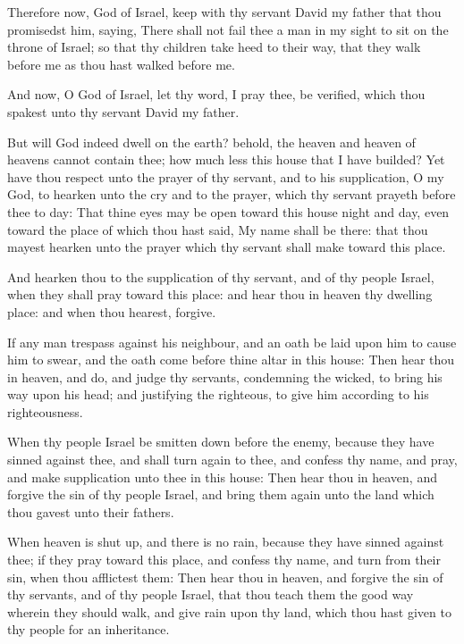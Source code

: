 \Verse Therefore now, \LORD God of Israel, keep with thy servant David my father that thou promisedst him, saying, There shall not fail thee a man in my sight to sit on the throne of Israel; so that thy children take heed to their way, that they walk before me as thou hast walked before me.

\Verse And now, O God of Israel, let thy word, I pray thee, be verified, which thou spakest unto thy servant David my father.

\Verse But will God indeed dwell on the earth? behold, the heaven and heaven of heavens cannot contain thee; how much less this house that I have builded?  \Verse Yet have thou respect unto the prayer of thy servant, and to his supplication, O \LORD my God, to hearken unto the cry and to the prayer, which thy servant prayeth before thee to day: \Verse That thine eyes may be open toward this house night and day, even toward the place of which thou hast said, My name shall be there: that thou mayest hearken unto the prayer which thy servant shall make toward this place.

\Verse And hearken thou to the supplication of thy servant, and of thy people Israel, when they shall pray toward this place: and hear thou in heaven thy dwelling place: and when thou hearest, forgive.

\Verse If any man trespass against his neighbour, and an oath be laid upon him to cause him to swear, and the oath come before thine altar in this house: \Verse Then hear thou in heaven, and do, and judge thy servants, condemning the wicked, to bring his way upon his head; and justifying the righteous, to give him according to his righteousness.

\Verse When thy people Israel be smitten down before the enemy, because they have sinned against thee, and shall turn again to thee, and confess thy name, and pray, and make supplication unto thee in this house: \Verse Then hear thou in heaven, and forgive the sin of thy people Israel, and bring them again unto the land which thou gavest unto their fathers.

\Verse When heaven is shut up, and there is no rain, because they have sinned against thee; if they pray toward this place, and confess thy name, and turn from their sin, when thou afflictest them: \Verse Then hear thou in heaven, and forgive the sin of thy servants, and of thy people Israel, that thou teach them the good way wherein they should walk, and give rain upon thy land, which thou hast given to thy people for an inheritance.

